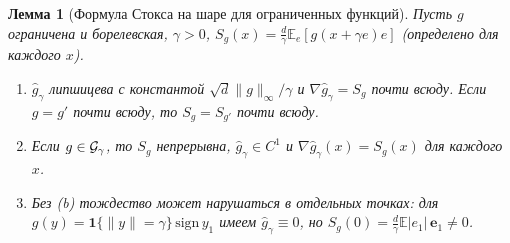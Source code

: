 \documentclass[11pt,a4paper]{article}
\numberwithin{equation}{section}
\newtheorem{lemma}[theorem]{Лемма}
\theoremstyle{definition}
\theoremstyle{remark}
\newcommand{\E}{\mathbb E}\newcommand{\R}{\mathbb R}\newcommand{\N}{\mathbb N}\let\Prob\relax\newcommand{\Prob}{\mathbb P}
\newcommand{\norm}[1]{\lVert #1\rVert}\newcommand{\abs}[1]{\lvert #1\rvert}\newcommand{\ip}[2]{\langle #1,#2\rangle}
\begin{document}
\begin{lemma}[Формула Стокса на шаре для ограниченных функций]\label{lem:stokes}
Пусть $g$ ограничена и борелевская, $\gamma>0$, $S_g(x)=\frac d\gamma\E_e[g(x+\gamma e)e]$ (определено для каждого $x$).
\begin{enumerate}[label=(\alph*)]
\item $\hat g_\gamma$ липшицева с константой $\sqrt d\norm g_\infty/\gamma$ и $\nabla\hat g_\gamma=S_g$ почти всюду. Если $g=g'$ почти всюду, то $S_g=S_{g'}$ почти всюду.
\item Если $g\in\mathcal G_\gamma$, то $S_g$ непрерывна, $\hat g_\gamma\in C^1$ и $\nabla\hat g_\gamma(x)=S_g(x)$ для каждого $x$.
\item Без (b) тождество может нарушаться в отдельных точках: для $g(y)=\mathbf 1\{\norm y=\gamma\}\,\mathrm{sign}\,y_1$ имеем $\hat g_\gamma\equiv0$, но $S_g(0)=\frac d\gamma\E\abs{e_1}\,\mathbf e_1\ne0$.
\end{enumerate}
\end{lemma}
\end{document}
